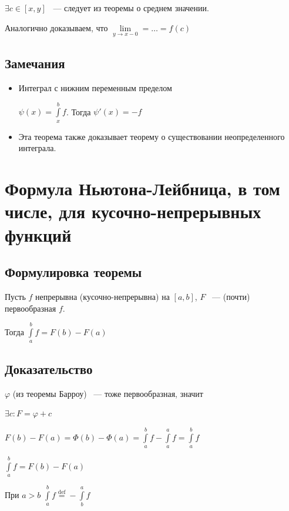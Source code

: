\documentclass{article}
\begin{document}
			$\exists c \in [x, y]$ ~--- следует из теоремы о среднем значении.
		
			Аналогично доказываем, что $\lim\limits_{y \rightarrow x - 0} = \ldots = f(c)$
		
		\subsection{Замечания}
		
			\begin{itemize}
			
				\item Интеграл с нижним переменным пределом
				
					$\psi(x) = \int\limits^b_x f$. Тогда $\psi'(x) = -f$
					
				\item Эта теорема также доказывает теорему о существовании неопределенного интеграла.
				
			\end{itemize}
			
	\newpage
	
	\section{Формула Ньютона-Лейбница, в том числе, для кусочно-непрерывных функций}
	
		\subsection{Формулировка теоремы}
		
			Пусть $f$ непрерывна (кусочно-непрерывна) на $[a, b]$, $F$ ~--- (почти) первообразная $f$. 
		
			Тогда $\int\limits^b_a f = F(b) - F(a)$
		
		\subsection{Доказательство}
		
			$\varphi$ (из теоремы Барроу) ~--- тоже первообразная, значит
			
			$\exists c : F = \varphi + c$
			
			$F(b) - F(a) = \Phi(b) - \Phi(a) = \int\limits^b_a f - \int\limits^a_a f = \int\limits^b_a f$
			
			$\int\limits^b_a f = F(b) - F(a)$
			
			При $a > b$ $\int\limits^b_a f \stackrel{\mathrm{def}}{=} - \int\limits^a_b f$
			
\end{document}

